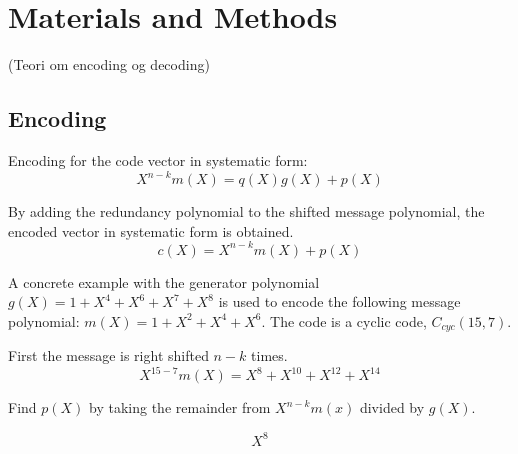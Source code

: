 \documentclass[Main]{subfiles}
\begin{document}
\section*{Materials and Methods}

(Teori om encoding og decoding)
\subsection*{Encoding}

\noindent Encoding for the code vector in systematic form:
\begin{equation}
X^{n-k}m(X) = q(X)g(X)+p(X)
\end{equation}

\noindent By adding the redundancy polynomial to the shifted message polynomial, the encoded vector in systematic form is obtained.
\begin{equation}
c(X) = X^{n-k}m(X)+p(X)
\end{equation}

\noindent A concrete example with the generator polynomial $g(X)=1+X^4+X^6+X^7+X^8$ is used to encode the following message polynomial:
$m(X)=1+X^2+X^4+X^6$. The code is a cyclic code, $C_{cyc}(15,7)$.

\noindent First the message is right shifted $n-k$ times.
\begin{equation}
X^{15-7}m(X) = X^8+X^{10}+X^{12}+X^{14}
\end{equation}

\noindent Find $p(X)$ by taking the remainder from $X^{n-k}m(x)$ divided by $g(X)$.

\begin{equation}
X^8
\end{equation}
\end{document}

